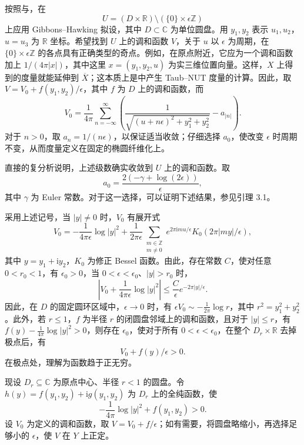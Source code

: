 按照与，在
\[
U=(D\times\mathbb R)\setminus(\{0\}\times\epsilon\mathbb Z)
\]
上应用 Gibbons--Hawking 拟设，其中 $D\subset\mathbb C$ 为单位圆盘。用 $y_1,y_2$ 表示 $u_1,u_2$，$u=u_3$ 为 $\mathbb R$ 坐标。希望找到 $U$ 上的调和函数 $V$，关于 $u$ 以 $\epsilon$ 为周期，在 $\{0\}\times\epsilon\mathbb Z$ 的各点具有正确类型的奇点。例如，在原点附近，它应为一个调和函数加上 $1/(4\pi|x|)$，其中这里 $x=(y_1,y_2,u)$ 为实三维位置向量。这样，$X$ 上得到的度量就能延伸到 $\overline X$；这本质上是中产生 Taub--NUT 度量的计算。因此，取 $V=V_0+f(y_1,y_2)/\epsilon$，其中 $f$ 为 $D$ 上的调和函数，而
\[
V_0=\frac1{4\pi}\sum_{n=-\infty}^{\infty}
\left(\frac1{\sqrt{(u+n\epsilon)^2+y_1^2+y_2^2}}-a_{|n|}\right).
\]
对于 $n>0$，取 $a_n=1/(n\epsilon)$，以保证适当收敛；仔细选择 $a_0$，使改变 $\epsilon$ 时周期不变，从而度量定义在固定的椭圆纤维化上。

直接的复分析说明，上述级数确实收敛到 $U$ 上的调和函数。取
\[
a_0=\frac{2(-\gamma+\log(2\epsilon))}{\epsilon},
\]
其中 $\gamma$ 为 Euler 常数。对于这一选择，可以证明下述结果，参见引理 3.1。
\begin{lemma}\label{lem:7.26}
采用上述记号，当 $|y|\neq0$ 时，$V_0$ 有展开式
\[
V_0=-\frac1{4\pi\epsilon}\log|y|^2
+\frac1{2\pi\epsilon}\sum_{\substack{m\in\mathbb Z\\m\neq0}}
e^{2\pi\mathrm i mu/\epsilon}K_0(2\pi|my|/\epsilon),
\]
其中 $y=y_1+\mathrm i y_2$，$K_0$ 为修正 Bessel 函数。由此，存在常数 $C$，使对任意 $0<r_0<1$，有 $\epsilon_0>0$，当 $0<\epsilon<\epsilon_0$、$|y|>r_0$ 时，
\[
\left|V_0+\frac1{4\pi\epsilon}\log|y|^2\right|
\leq\frac C\epsilon e^{-2\pi|y|/\epsilon}.
\]
因此，在 $D$ 的固定圆环区域中，$\epsilon\to0$ 时，有 $\epsilon V_0\sim-\tfrac1{2\pi}\log r$，其中 $r^2=y_1^2+y_2^2$。此外，若 $r\leq1$，$f$ 为半径 $r$ 的闭圆盘邻域上的调和函数，且对于 $|y|\leq r$，有 $f(y)-\tfrac1{4\pi}\log|y|^2>0$，则存在 $\epsilon_0$，使对于所有 $0<\epsilon<\epsilon_0$，在整个 $D_r\times\mathbb R$ 去掉极点后，有
\[
V_0+f(y)/\epsilon>0.
\]
在极点处，理解为函数趋于正无穷。
\end{lemma}

现设 $D_r\subseteq\mathbb C$ 为原点中心、半径 $r<1$ 的圆盘。令 $h(y)=f(y_1,y_2)+\mathrm i g(y_1,y_2)$ 为 $D_r$ 上的全纯函数，使
\[
-\frac1{4\pi}\log|y|^2+f(y_1,y_2)>0.
\]
设 $V_0$ 为定义的调和函数，取 $V=V_0+f/\epsilon$；如有需要，将圆盘略缩小，再选择足够小的 $\epsilon$，使 $V$ 在 $Y$ 上正定。

